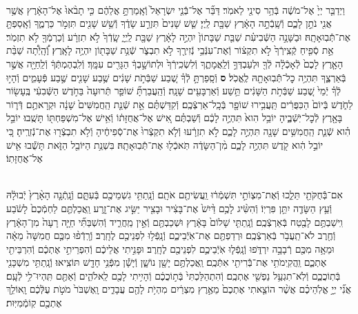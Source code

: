 \documentclass[twoside, openany, parskip=half, 11pt]{book}
\begin{document}
\begin{footnotesize}
\begin{multicols}{2}
\\
וַיְדַבֵּ֤ר יְיָ֙ אֶל־מֹשֶׁ֔ה בְּֿהַ֥ר סִינַ֖י לֵאמֹֽר׃ דַּבֵּ֞ר אֶל־בְּֿֿנֵ֤י יִשְׂרָאֵל֙ וְֿאָֽמַרְתָּ֣ אֲלֵהֶ֔ם כִּ֤י תָבֹ֨אוּ֙ אֶל־הָאָ֔רֶץ אֲשֶׁ֥ר אֲנִ֖י נֹתֵ֣ן לָכֶ֑ם וְֿשָֽׁבְֿתָ֣ה הָאָ֔רֶץ שַׁבָּ֖ת לַֽיְיָ׃ שֵׁ֤שׁ שָׁנִים֙ תִּזְרַ֣ע שָׂדֶ֔ךָ וְֿשֵׁ֥שׁ שָׁנִ֖ים תִּזְמֹ֣ר כַּרְמֶ֑ךָ וְֿאָֽסַפְתָּ֖ אֶת־תְּֿֿבֽוּאָתָֽהּ׃  וּבַשָּׁנָ֣ה הַשְּֿׁבִיעִ֗ת שַׁבַּ֤ת שַׁבָּתוֹן֙ יִהְיֶ֣ה לָאָ֔רֶץ שַׁבָּ֖ת לַֽיְיָ֑ שָֽׂדְֿךָ֙ לֹ֣א תִזְרָ֔ע וְֿכַרְמְֿךָ֖ לֹ֥א תִזְמֹֽר׃ אֵ֣ת סְֿפִ֤יחַ קְֿצִֽירְֿךָ֙ לֹ֣א תִקְצ֔וֹר וְֿאֶת־עִנְּֿבֵ֥י נְֿזִירֶ֖ךָ לֹ֣א תִבְצֹ֑ר שְֿׁנַ֥ת שַׁבָּת֖וֹן יִהְיֶ֥ה לָאָֽרֶץ׃ וְֽֿ֠הָֽיְֿתָ֠ה שַׁבַּ֨ת הָאָ֤רֶץ לָכֶם֙ לְֿאָכְֿלָ֔ה לְֿךָ֖ וּלְעַבְדְּךָ֣ וְֿלַֽאֲמָתֶ֑ךָ וְֿלִשְׂכִֽירְֿךָ֙ וּלְתוֹשָׁ֣בְךָ֔ הַגָּרִ֖ים עִמָּֽךְ׃ וְֿלִֽבְהֶמְתְּֿךָ֔ וְֿלַֽחַיָּ֖ה אֲשֶׁ֣ר בְּֿאַרְצֶ֑ךָ תִּהְיֶ֥ה כׇל־תְּֿֿבֽוּאָתָ֖הּ לֶֽאֱכֹֽל׃ \textbf{ס}  וְֿסָֽפַרְתָּ֣ לְֿךָ֗ שֶׁ֚בַע שַׁבְּֿתֹ֣ת שָׁנִ֔ים שֶׁ֥בַע שָׁנִ֖ים שֶׁ֣בַע פְּֿעָמִ֑ים וְֿהָי֣וּ לְֿךָ֗ יְֿמֵי֙ שֶׁ֚בַע שַׁבְּֿתֹ֣ת הַשָּׁנִ֔ים תֵּ֥שַׁע וְֿאַרְבָּעִ֖ים שָׁנָֽה׃ וְֿהַֽעֲבַרְתָּ֞ שׁוֹפַ֤ר תְּֿרוּעָה֙ בַּחֹ֣דֶשׁ הַשְּֿׁבִעִ֔י בֶּֽעָשׂ֖וֹר לַחֹ֑דֶשׁ בְּֿיוֹם֙ הַכִּפֻּרִ֔ים תַּֽעֲבִ֥ירוּ שׁוֹפָ֖ר בְּֿכָֽל־אַרְצְֿכֶֽם׃ וְֿקִדַּשְׁתֶּ֗ם אֵ֣ת שְֿׁנַ֤ת הַֽחֲמִשִּׁים֙ שָׁנָ֔ה וּקְרָאתֶ֥ם דְּֿר֛וֹר בָּאָ֖רֶץ לְֿכׇל־יֹֽשְֿׁבֶ֑יהָ יוֹבֵ֥ל הִוא֙ תִּהְיֶ֣ה לָכֶ֔ם וְֿשַׁבְתֶּ֗ם אִ֚ישׁ אֶל־אֲחֻזָּת֔וֹ וְֿאִ֥ישׁ אֶל־מִשְׁפַּחְתּ֖וֹ תָּשֻֽׁבוּ׃ יוֹבֵ֣ל הִ֗וא שְֿׁנַ֛ת הַֽחֲמִשִּׁ֥ים שָׁנָ֖ה תִּהְיֶ֣ה לָכֶ֑ם לֹ֣א תִזְרָ֔עוּ וְֿלֹ֤א תִקְצְֿרוּ֙ אֶת־סְֿפִיחֶ֔יהָ וְֿלֹ֥א תִבְצְֿר֖וּ אֶת־נְֿזִרֶֽיהָ׃ כִּ֚י יוֹבֵ֣ל הִ֔וא קֹ֖דֶשׁ תִּהְיֶ֣ה לָכֶ֑ם מִ֨ן־הַשָּׂדֶ֔ה תֹּֽאכְֿל֖וּ אֶת־תְּֿֿבֽוּאָתָֽהּ׃ בִּשְׁנַ֥ת הַיּוֹבֵ֖ל הַזֹּ֑את תָּשֻׁ֕בוּ אִ֖ישׁ אֶל־אֲחֻזָּתֽוֹ׃


\\
אִם־בְּֿֿחֻקֹּתַ֖י תֵּלֵ֑כוּ וְֿאֶת־מִצְוֹתַ֣י תִּשְׁמְֿר֔וּ וַֽעֲשִׂיתֶ֖ם אֹתָֽם׃ וְֿנָֽתַתִּ֥י גִשְׁמֵיכֶ֖ם בְּֿעִתָּ֑ם וְֿנָֽתְֿנָ֤ה הָאָ֨רֶץ֙ יְֿבוּלָ֔הּ וְֿעֵ֥ץ הַשָּׂדֶ֖ה יִתֵּ֥ן פִּרְיֽוֹ׃ וְֿהִשִּׂ֨יג לָכֶ֥ם דַּ֨יִשׁ֙ אֶת־בָּצִ֔יר וּבָצִ֖יר יַשִּׂ֣יג אֶת־זָ֑רַע וַֽאֲכַלְתֶּ֤ם לַחְמְֿכֶם֙ לָשֹׂ֔בַע וִֽישַׁבְתֶּ֥ם לָבֶ֖טַח בְּֿאַרְצְֿכֶֽם׃  וְֿנָֽתַתִּ֤י שָׁלוֹם֙ בָּאָ֔רֶץ וּשְׁכַבְתֶּ֖ם וְֿאֵ֣ין מַֽחֲרִ֑יד וְֿהִשְׁבַּתִּ֞י חַיָּ֤ה רָעָה֙ מִן־הָאָ֔רֶץ וְֿחֶ֖רֶב לֹא־תַֽעֲבֹ֥ר בְּֿאַרְצְֿכֶֽם׃ וּרְדַפְתֶּ֖ם אֶת־אֹֽיְֿבֵיכֶ֑ם וְֿנָֽפְֿל֥וּ לִפְנֵיכֶ֖ם לֶחָֽרֶב׃ וְֿרָֽדְֿפ֨וּ מִכֶּ֤ם חֲמִשָּׁה֙ מֵאָ֔ה וּמֵאָ֥ה מִכֶּ֖ם רְֿבָבָ֣ה יִרְדֹּ֑פוּ וְֿנָֽפְֿל֧וּ אֹֽיְֿבֵיכֶ֛ם לִפְנֵיכֶ֖ם לֶחָֽרֶב׃ וּפָנִ֣יתִי אֲלֵיכֶ֔ם וְֿהִפְרֵיתִ֣י אֶתְכֶ֔ם וְֿהִרְבֵּיתִ֖י אֶתְכֶ֑ם וַֽהֲקִֽימֹתִ֥י אֶת־בְּֿֿרִיתִ֖י אִתְּֿכֶֽם׃  וַֽאֲכַלְתֶּ֥ם יָשָׁ֖ן נוֹשָׁ֑ן וְֿיָשָׁ֕ן מִפְּֿנֵ֥י חָדָ֖שׁ תּוֹצִֽיאוּ׃ וְֿנָֽתַתִּ֥י מִשְׁכָּנִ֖י בְּֿתֽוֹכֲכֶ֑ם וְֿלֹֽא־תִגְעַ֥ל נַפְשִׁ֖י אֶתְכֶֽם׃ וְֿהִתְהַלַּכְתִּי֙ בְּֿת֣וֹכֲכֶ֔ם וְֿהָיִ֥יתִי לָכֶ֖ם לֵֽאלֹהִ֑ים וְֿאַתֶּ֖ם תִּֽהְיוּ־לִ֥י לְֿעָֽם׃ אֲנִ֞י יְיָ֣ אֱלֹֽהֵיכֶ֗ם אֲשֶׁ֨ר הוֹצֵ֤אתִי אֶתְכֶם֙ מֵאֶ֣רֶץ מִצְרַ֔יִם מִהְיֹ֥ת לָהֶ֖ם עֲבָדִ֑ים וָֽאֶשְׁבֹּר֙ מֹטֹ֣ת עֻלְּֿכֶ֔ם וָֽאוֹלֵ֥ךְ אֶתְכֶ֖ם קֽוֹמְֿמִיּֽוּת׃


\end{multicols}
\end{footnotesize}
\end{document}
